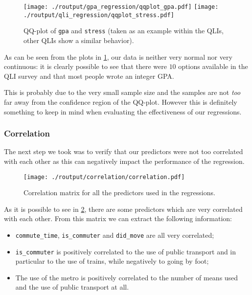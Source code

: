 \documentclass[11pt]{extarticle}
\numberwithin{table}{section}
\numberwithin{figure}{section}
\numberwithin{equation}{section}
\begin{document}
\begin{figure}[!ht]
	\centering
	{\texttt{[image: ./routput/gpa\_regression/qqplot\_gpa.pdf]}}
	\hspace{1cm}
	{\texttt{[image: ./routput/qli\_regression/qqplot\_stress.pdf]}}
	\caption{QQ-plot of \texttt{gpa} and \texttt{stress}
		(taken as an example within the QLIs, other QLIs show a similar behavior).
	}
	\label{fig:qq-gpa-stress}
\end{figure}

As can be seen from the plots in \cref{fig:qq-gpa-stress},
our data is neither very normal nor very continuous:
it is clearly possible to see that there were $10$ options available in the QLI survey
and that most people wrote an integer GPA.

This is probably due to the very small sample size
and the samples are not \textit{too} far away from the confidence region of the QQ-plot.
However this is definitely something to keep in mind when
evaluating the effectiveness of our regressions.

\subsubsection{Correlation}
\label{sec:correlation}

The next step we took was to verify that our predictors
were not too correlated with each other as this can negatively impact the performance
of the regression.

\begin{figure}[!ht]
	\centering
	\texttt{[image: ./routput/correlation/correlation.pdf]}
	\caption{Correlation matrix for all the predictors used in the regressions.}
	\label{fig:corr}
\end{figure}

As it is possible to see in \cref{fig:corr}, there are some predictors which
are very correlated with each other.
From this matrix we can extract the following information:
\begin{itemize}
	\item \texttt{commute\_time}, \texttt{is\_commuter} and \texttt{did\_move}
	      are all very correlated;
	\item \texttt{is\_commuter} is positively correlated to the use of public transport
	      and in particular to the use of trains, while negatively to going by foot;
	\item The use of the metro is positively correlated to
	      the number of means used and the use of public transport at all.
\end{itemize}
\end{document}
